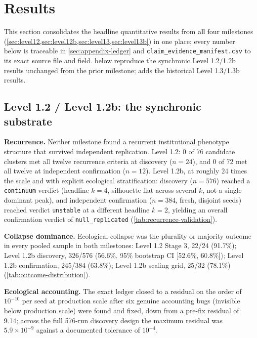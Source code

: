 \section{Results}
\label{sec:results}

This section consolidates the headline quantitative results from all four
milestones (\cref{sec:level12,sec:level12b,sec:level13,sec:level13b}) in
one place; every number below is traceable in \cref{sec:appendix-ledger}
and \texttt{claim\_evidence\_manifest.csv} to its exact source file and
field.  below reproduce the
synchronic Level 1.2/1.2b results unchanged from the prior milestone;
 adds the historical Level 1.3/1.3b results.

\subsection{Level 1.2 / Level 1.2b: the synchronic substrate}
\label{sec:results-l12}
\label{sec:results-l12b-subhead}

\textbf{Recurrence.} Neither milestone found a recurrent institutional
phenotype structure that survived independent replication. Level 1.2:
0 of 76 candidate clusters met all twelve recurrence criteria at
discovery ($n=24$), and 0 of 72 met all twelve at independent confirmation
($n=12$). Level 1.2b, at roughly 24 times the scale and with explicit
ecological stratification: discovery ($n=576$) reached a \texttt{continuum}
verdict (headline $k=4$, silhouette flat across several $k$, not a single
dominant peak), and independent confirmation ($n=384$, fresh, disjoint
seeds) reached verdict \texttt{unstable} at a different headline $k=2$,
yielding an overall confirmation verdict of \texttt{null\_replicated}
(\cref{tab:recurrence-validation}).

\textbf{Collapse dominance.} Ecological collapse was the plurality or
majority outcome in every pooled sample in both milestones: Level 1.2
Stage 3, 22/24 (91.7\%); Level 1.2b discovery, 326/576 (56.6\%, 95\%
bootstrap CI [52.6\%, 60.8\%]); Level 1.2b confirmation, 245/384
(63.8\%); Level 1.2b scaling grid, 25/32 (78.1\%)
(\cref{tab:outcome-distribution}).

\textbf{Ecological accounting.} The exact ledger closed to a residual on
the order of $10^{-10}$ per seed at production scale after six genuine
accounting bugs (invisible below production scale) were found and fixed,
down from a pre-fix residual of 9.14; across the full 576-run discovery
design the maximum residual was $5.9\times10^{-9}$ against a documented
tolerance of $10^{-4}$.

